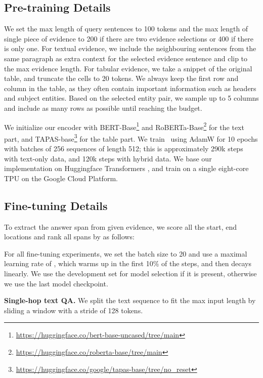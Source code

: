 \documentclass[11pt]{article}
\newcommand{\revise}[1]{#1}
\newcommand{\nop}[1]{}
\newcommand{\ours}[0]{\text{ReasonBERT}}
\begin{document}
\subsection{Pre-training Details}
\label{sec:pretrain_detail}
We set the max length of query sentences to 100 tokens and the max length of \nop{each evidence sample}\revise{single piece of evidence} to 200 if there are two evidence selections or 400 if there is only one. For textual evidence, we include the neighbouring sentences from the same paragraph as extra context for the selected evidence sentence and clip to the max evidence length. For tabular evidence, we take a snippet of the original table, and truncate the cells to 20 tokens. We always keep the first row and column in the table, as they often contain important information such as headers and subject entities. Based on the selected entity pair, we sample up to 5 columns and include as many rows as possible until reaching the budget.

We initialize {our encoder} with BERT-Base\footnote{\url{https://huggingface.co/bert-base-uncased/tree/main}} and RoBERTa-Base\footnote{\url{https://huggingface.co/roberta-base/tree/main}} for the text part\nop{-only setting}, and TAPAS-base\footnote{\url{https://huggingface.co/google/tapas-base/tree/no_reset}} for the table part\nop{hybrid setting}. We train \ours\ using AdamW \cite{Loshchilov2019DecoupledWD} for 10 epochs with batches of 256 sequences of length 512; this is approximately 290k steps with text-only data, and 120k steps with hybrid data. We base our implementation on Huggingface Transformers \cite{wolf-etal-2020-transformers}, and train on a single eight-core TPU on the Google Cloud Platform.

\subsection{Fine-tuning Details}
\label{sec:finetune_detail}
To extract the answer span from given evidence, we score all the start, end locations and rank all spans  by  as follows:

{\small{}}

For all fine-tuning experiments, we set the batch size to 20 and use a maximal learning rate of , which warms up in the first 10\% of the steps, and then decays linearly. We use the development set for model selection if it is present, otherwise we use the last model checkpoint. 

\noindent\textbf{Single-hop text QA.}
We split the text sequence to fit the max input length by sliding a window with a stride of 128 tokens.
\end{document}
